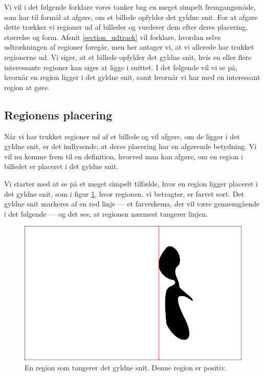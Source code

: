 {
\def\imgscale{0.34}

\textsf{Vi vil i det følgende forklare vores tanker bag en meget simpelt
fremgangsmåde, som har til formål at afgøre, om et billede opfylder det
gyldne snit. For at afgøre dette trækker vi regioner ud af billeder og
vurderer dem efter deres placering, størrelse og form. Afsnit
\ref{section_udtraek} vil forklare, hvordan selve udtrækningen af
regioner foregår, men her antager vi, at vi allerede har trukket
regionerne ud. Vi siger, at et billede opfylder det gyldne snit, hvis en
eller flere interessante regioner kan siges at ligge i snittet.  I det
følgende vil vi se på, hvornår en region ligger i det gyldne snit, samt
hvornår vi har med en interessant region at gøre.
}

\subsection{Regionens placering}
Når vi har trukket regioner ud af et billede og vil afgøre, om de ligger
i det gyldne snit, er det indlysende, at deres placering har en afgørende
betydning.  Vi vil nu komme frem til en definition, hvorved man kan
afgøre, om en region i billedet er placeret i det gyldne snit.

Vi starter med at se på et meget simpelt tilfælde, hvor en region ligger
placeret i det gyldne snit, som i figur \ref{pos_naiv_1}, hvor regionen,
vi betragter, er farvet sort.  Det gyldne snit markeres af en rød linje
--- et farveskema, der vil være gennemgående i det følgende --- og det
ses, at regionen nærmest tangerer linjen.

\begin{figure}[h]
    \begin{center}
        \includegraphics[scale=\imgscale,angle=0]{afsnit/vores_implementation/billeder/naiv_algoritme/naiv_positiv_blob_1}
    \end{center}
    \caption[En positiv region]{En region som tangerer det gyldne snit.
    Denne region er positiv.}
    \label{pos_naiv_1}
\end{figure}

}
